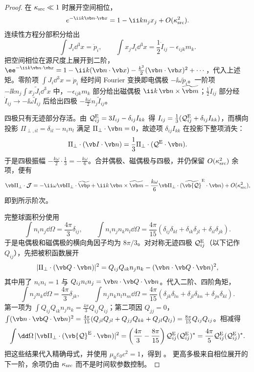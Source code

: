 \begin{proof}
在 \(\kappa_{\rm src}\ll1\) 时展开空间相位，
\[
 e^{-\ii k\vb n\cdot\vb x}
 =1-\ii k n_jx_j+O(\kappa_{\rm src}^2).
\]
连续性方程分部积分给出
\[
 \int J_i\dd^3x=\dot p_i,\qquad
 \int x_jJ_i\dd^3x=\frac12\dot I_{ij}-\epsilon_{ijk}m_k .
\]
把空间相位在源尺度上展开到二阶，\(\ee^{-\ii k\vb n\cdot\vb x}=1-\ii k(\vb n\cdot\vb x)-\frac{k^2}{2}(\vb n\cdot\vb x)^2+\cdots\)，代入上述矩。零阶项 \(\int J_i\dd^3x=\dot p_i\) 经时间 Fourier 变换即电偶极 \(-\ii\omega\widetilde p_i\)。一阶项 \(-\ii k n_j\int x_j\widetilde J_i\dd^3x\) 中，\(-\epsilon_{ijk}m_k\) 部分给出磁偶极 \(\ii k\,\vb n\times\widetilde{\vb m}\)；\(\frac12\dot I_{ij}\) 部分经 \(\dot I_{ij}\to-\ii\omega\widetilde I_{ij}\) 后给出四极 \(-\frac{k\omega}{2}n_j\widetilde I_{ij}\)。

四极只有无迹部分存活。由 \(\mathcal Q^{\rm E}_{ij}=3I_{ij}-\delta_{ij}I_{kk}\) 得 \(I_{ij}=\frac13(\mathcal Q^{\rm E}_{ij}+\delta_{ij}I_{kk})\)，而横向投影 \(\Pi_{\perp,il}=\delta_{il}-n_in_l\) 满足 \(\Pi_\perp\cdot\vb n=0\)，故迹项 \(\delta_{ij}I_{kk}\) 在投影下整项消失：
\[
 \Pi_\perp\cdot(\vb I\cdot\vb n)
 =\frac13\Pi_\perp\cdot(\mathcal Q^{\rm E}\cdot\vb n).
\]
于是四极振幅 \(-\frac{k\omega}{2}\cdot\frac13=-\frac{k\omega}{6}\)。合并偶极、磁偶极与四极，并仍保留 \(O(\kappa_{\rm src}^2)\) 余项，便有
\[
 \vb\Pi_\perp\cdot\boldsymbol{\mathcal J}
 =-\ii\omega\vb\Pi_\perp\cdot\widetilde{\vb p}
 +\ii k\,\vb n\times\widetilde{\vb m}
 -\frac{k\omega}{6}\vb\Pi_\perp\cdot
 (\widetilde{\vb{\mathcal Q}}^{\rm E}\cdot\vb n)
 +O(\kappa_{\rm src}^2),
\]
即到所示阶次。

完整球面积分使用
\[
 \int n_in_j\dd\Omega=\frac{4\pi}{3}\delta_{ij},\qquad
 \int n_in_jn_kn_l\dd\Omega
 =\frac{4\pi}{15}
 (\delta_{ij}\delta_{kl}+\delta_{ik}\delta_{jl}+\delta_{il}\delta_{jk}).
\]
于是电偶极和磁偶极的横向角因子均为 \(8\pi/3\)。对对称无迹四极 \(\mathcal Q^{\rm E}_{ij}\)（以下记作 \(Q_{ij}\)），先把被积函数展开
\[
 |\Pi_\perp\cdot(\vb Q\cdot\vb n)|^2
 =Q_{ij}Q_{ik}n_jn_k-(\vb n\cdot\vb Q\cdot\vb n)^2,
\]
其中用了 \(n_in_i=1\) 与 \(Q_{ij}n_in_j=\vb n\cdot\vb Q\cdot\vb n\)。代入二阶、四阶角矩，
\[
 \int n_jn_k\dd\Omega=\frac{4\pi}{3}\delta_{jk},\qquad
 \int n_jn_kn_ln_m\dd\Omega=\frac{4\pi}{15}(\delta_{jk}\delta_{ln}+\delta_{jl}\delta_{kn}+\delta_{jn}\delta_{kl}).
\]
第一项为 \(\int Q_{ij}Q_{ik}n_jn_k=\frac{4\pi}{3}Q_{ij}Q_{ij}\)；第二项因 \(Q_{jj}=0\)，\(\int(\vb n\cdot\vb Q\cdot\vb n)^2=\frac{4\pi}{15}(Q_{jl}Q_{jl}+Q_{jj}Q_{kk}+Q_{jl}Q_{lj})=\frac{8\pi}{15}Q_{ij}Q_{ij}\)。相减得
\[
 \int\dd\Omega\,|\vb\Pi_\perp\cdot(\vb{\mathcal Q}^{\rm E}\cdot\vb n)|^2
 =\left(\frac{4\pi}{3}-\frac{8\pi}{15}\right)\mathcal Q^{\rm E}_{ij}(\mathcal Q^{\rm E}_{ij})^*
 =\frac{4\pi}{5}\mathcal Q^{\rm E}_{ij}(\mathcal Q^{\rm E}_{ij})^*.
\]
把这些结果代入精确母式，并使用
\(\mu_0\varepsilon_0c^2=1\)，得到
。
更高多极来自相位展开的下一阶，余项仍由
\(\kappa_{\rm src}\) 而不是时间软参数控制。
\end{proof}
